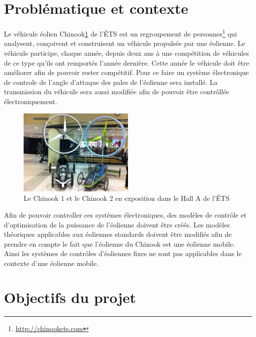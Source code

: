 \documentclass[11pt]{article}
\begin{document}
\listoffigures
{}


\clearpage

\section{Problématique et contexte}

Le véhicule éolien Chinook\ref{fig:chinookHall} de l'ÉTS est un regroupement de personnes\footnote{\url{http://chinookets.com}} qui analysent, conçoivent et construisent un véhicule propulsée par une éolienne. Le véhicule participe, chaque année, depuis deux ans à une compétition de véhicules de ce type qu'ils ont remportés l'année dernière. Cette année le véhicule doit être améliorer afin de pouvoir rester compétitif. Pour ce faire un système électronique de controle de l'angle d'attaque des pales de l'éolienne sera installé. La transmission du véhicule sera aussi modifiée afin de pouvoir être contrôllée électroniquement. 

\begin{figure}[H]
  \centering
  \includegraphics[width=0.5\textwidth]{images/chinook_1_et_2.jpg}
  \caption[Chinook 1 et 2]{Le Chinook 1 et le Chinook 2 en exposition dans le Hall A de l'ÉTS}
  \label{fig:chinookHall}
\end{figure}

Afin de pouvoir controller ces systèmes électroniques, des modèles de contrôle et d'optimisation de la puissance de l'éolienne doivent être créés. Les modèles théoriques applicables aux éoliennes standards doivent être modifiés afin de prendre en compte le fait que l'éolienne du Chinook est une éolienne mobile. Ainsi les systèmes de contrôles d'éoliennes fixes ne sont pas applicables dans le contexte d'une éolienne mobile.

\section{Objectifs du projet}
\end{document}
